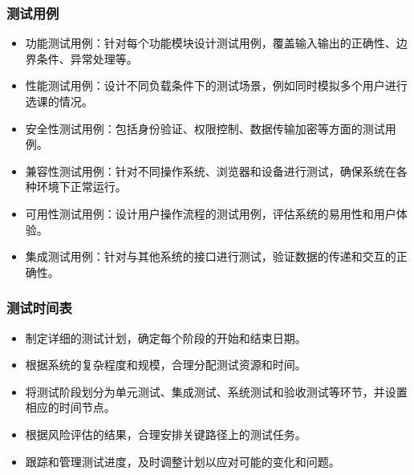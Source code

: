 \documentclass{article}
\begin{document}
\subsubsection{测试用例}
\begin{itemize}
	\item 功能测试用例：针对每个功能模块设计测试用例，覆盖输入输出的正确性、边界条件、异常处理等。
	\item 性能测试用例：设计不同负载条件下的测试场景，例如同时模拟多个用户进行选课的情况。
	\item 安全性测试用例：包括身份验证、权限控制、数据传输加密等方面的测试用例。
	\item 兼容性测试用例：针对不同操作系统、浏览器和设备进行测试，确保系统在各种环境下正常运行。
	\item 可用性测试用例：设计用户操作流程的测试用例，评估系统的易用性和用户体验。
	\item 集成测试用例：针对与其他系统的接口进行测试，验证数据的传递和交互的正确性。
\end{itemize}

\subsubsection{测试时间表}
\begin{itemize}
	\item 制定详细的测试计划，确定每个阶段的开始和结束日期。
	\item 根据系统的复杂程度和规模，合理分配测试资源和时间。
	\item 将测试阶段划分为单元测试、集成测试、系统测试和验收测试等环节，并设置相应的时间节点。
	\item 根据风险评估的结果，合理安排关键路径上的测试任务。
	\item 跟踪和管理测试进度，及时调整计划以应对可能的变化和问题。
\end{itemize}
\end{document}
